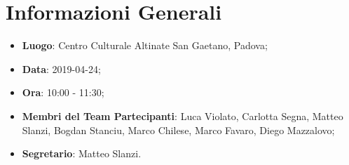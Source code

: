 \section{Informazioni Generali}
\begin{itemize}
	\item \textbf{Luogo}: Centro Culturale Altinate San Gaetano, Padova; 
	\item \textbf{Data}: 2019-04-24;
	\item \textbf{Ora}: 10:00 - 11:30;
	\item \textbf{Membri del Team Partecipanti}: Luca Violato, Carlotta Segna, Matteo Slanzi, Bogdan Stanciu, Marco Chilese, Marco Favaro, Diego Mazzalovo; 
	\item \textbf{Segretario}: Matteo Slanzi. 
\end{itemize}



